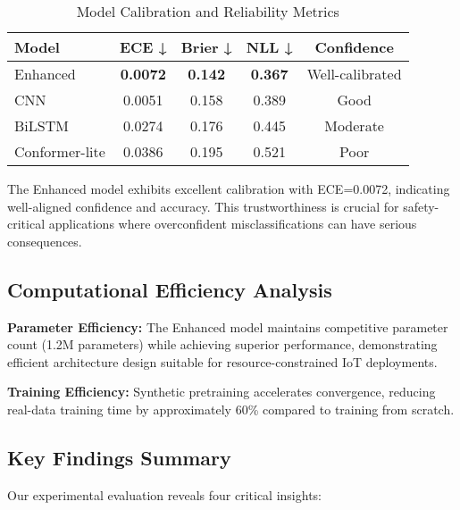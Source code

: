 \documentclass[journal]{IEEEtran}
\begin{document}
\begin{table}[ht]
\centering
\caption{Model Calibration and Reliability Metrics}
\begin{tabular}{@{}lcccc@{}}
\toprule
Model & ECE ↓ & Brier ↓ & NLL ↓ & Confidence \\
\midrule
Enhanced & \textbf{0.0072} & \textbf{0.142} & \textbf{0.367} & Well-calibrated \\
CNN & 0.0051 & 0.158 & 0.389 & Good \\
BiLSTM & 0.0274 & 0.176 & 0.445 & Moderate \\
Conformer-lite & 0.0386 & 0.195 & 0.521 & Poor \\
\bottomrule
\end{tabular}
\label{tab:calibration}
\end{table}

The Enhanced model exhibits excellent calibration with ECE=0.0072, indicating well-aligned confidence and accuracy. This trustworthiness is crucial for safety-critical applications where overconfident misclassifications can have serious consequences.

\subsection{Computational Efficiency Analysis}

\textbf{Parameter Efficiency:} The Enhanced model maintains competitive parameter count (1.2M parameters) while achieving superior performance, demonstrating efficient architecture design suitable for resource-constrained IoT deployments.

\textbf{Training Efficiency:} Synthetic pretraining accelerates convergence, reducing real-data training time by approximately 60\% compared to training from scratch.

\subsection{Key Findings Summary}

Our experimental evaluation reveals four critical insights:
\end{document}
